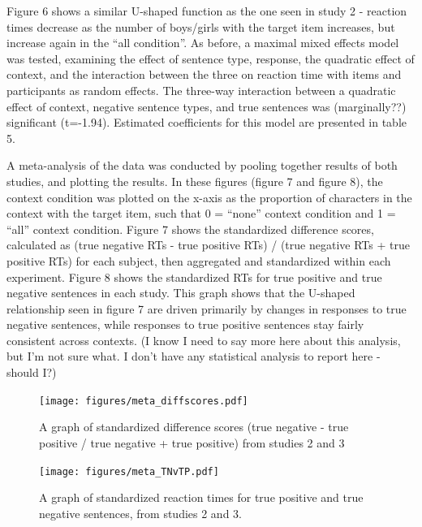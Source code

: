 \documentclass[man]{apa2}
\begin{document}
Figure 6 shows a similar U-shaped function as the one seen in study 2 - reaction times decrease as the number of boys/girls with the target item increases, but increase again in the ``all condition''.  As before, a maximal mixed effects model was tested, examining the effect of sentence type, response, the quadratic effect of context, and the interaction between the three on reaction time with items and participants as random effects.  The three-way interaction between a quadratic effect of context, negative sentence types, and true sentences was (marginally??) significant (t=-1.94).  Estimated coefficients for this model are presented in table 5.  

A meta-analysis of the data was conducted by pooling together results of both studies, and plotting the results.  In these figures (figure 7 and figure 8), the context condition was plotted on the x-axis as the proportion of characters in the context with the target item, such that 0 = ``none'' context condition and 1 = ``all'' context condition.  Figure 7 shows the standardized difference scores, calculated as (true negative RTs - true positive RTs) / (true negative RTs + true positive RTs) for each subject, then aggregated and standardized within each experiment.  Figure 8 shows the standardized RTs for true positive and true negative sentences in each study.  This graph shows that the U-shaped relationship seen in figure 7 are driven primarily by changes in responses to true negative sentences, while responses to true positive sentences stay fairly consistent across contexts.  (I know I need to say more here about this analysis, but I'm not sure what.  I don't have any statistical analysis to report here - should I?)

\begin{figure}
\begin{center} 
\texttt{[image: figures/meta\_diffscores.pdf]}
\caption{\label{fig:addition_subs}A graph of standardized difference scores (true negative - true positive / true negative + true positive) from studies 2 and 3}
\end{center} 
\end{figure}

\begin{figure}
\begin{center} 
\texttt{[image: figures/meta\_TNvTP.pdf]}
\caption{\label{fig:addition_subs} A graph of standardized reaction times for true positive and true negative sentences, from studies 2 and 3.}
\end{center} 
\end{figure}
\end{document}
